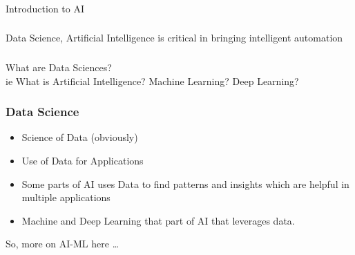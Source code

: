\begin{frame}[fragile]\frametitle{}
\begin{center}
{\Large Introduction to AI}
\end{center}
\end{frame}

\begin{frame}[fragile]\frametitle{}
\begin{center}
{\Large Data Science, Artificial Intelligence is critical in bringing intelligent automation}
\end{center}
\end{frame}



\begin{frame}[fragile]\frametitle{}
\begin{center}
{\Large What are Data Sciences? \\ \small ie What is Artificial Intelligence? Machine Learning? Deep Learning?}
\end{center}
\end{frame}


\begin{frame}[fragile]\frametitle{Data Science}

\begin{itemize}
\item Science of Data (obviously)
\item Use of Data for Applications
\item Some parts of AI uses Data to find patterns and insights which are helpful in multiple applications
\item Machine and Deep Learning that part of AI that leverages data.
\end{itemize}

So, more on AI-ML here \ldots

\end{frame}




